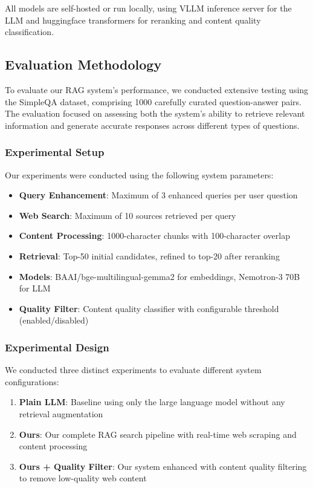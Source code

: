 \documentclass[fleqn,moreauthors,10pt]{ds_report}
\begin{document}
All models are self-hosted or run locally, using VLLM inference server for the LLM and huggingface transformers for reranking and content quality classification.

\subsection*{Evaluation Methodology}
To evaluate our RAG system's performance, we conducted extensive testing using the SimpleQA dataset, comprising 1000 carefully curated question-answer pairs. The evaluation focused on assessing both the system's ability to retrieve relevant information and generate accurate responses across different types of questions.

\subsubsection*{Experimental Setup}
Our experiments were conducted using the following system parameters:
\begin{itemize}[noitemsep]
    \item \textbf{Query Enhancement}: Maximum of 3 enhanced queries per user question
    \item \textbf{Web Search}: Maximum of 10 sources retrieved per query
    \item \textbf{Content Processing}: 1000-character chunks with 100-character overlap
    \item \textbf{Retrieval}: Top-50 initial candidates, refined to top-20 after reranking
    \item \textbf{Models}: BAAI/bge-multilingual-gemma2 for embeddings, Nemotron-3 70B for LLM
    \item \textbf{Quality Filter}: Content quality classifier with configurable threshold (enabled/disabled)
\end{itemize}

\subsubsection*{Experimental Design}
We conducted three distinct experiments to evaluate different system configurations:

\begin{enumerate}[noitemsep]
    \item \textbf{Plain LLM}: Baseline using only the large language model without any retrieval augmentation
    \item \textbf{Ours}: Our complete RAG search pipeline with real-time web scraping and content processing
    \item \textbf{Ours + Quality Filter}: Our system enhanced with content quality filtering to remove low-quality web content
\end{enumerate}
\end{document}
